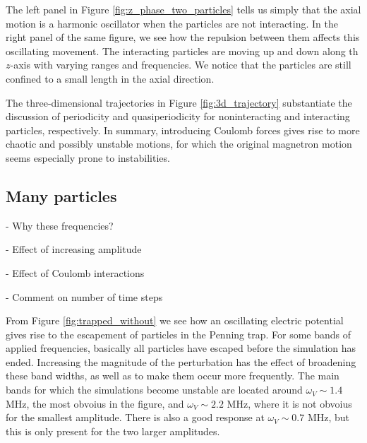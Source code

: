 The left panel in Figure \ref{fig:z_phase_two_particles} tells us simply that the axial motion is a harmonic oscillator  when the particles are not interacting. In the right panel of the same figure, we see how the repulsion between them affects this oscillating movement. The interacting particles are moving up and down along th $z$-axis with varying ranges and frequencies. We notice that the particles are still confined to a small length in the axial direction. 

The three-dimensional trajectories in Figure \ref{fig:3d_trajectory} substantiate the discussion of periodicity and quasiperiodicity for noninteracting and interacting particles, respectively. In summary, introducing Coulomb forces gives rise to more chaotic and possibly unstable motions, for which the original magnetron motion seems especially prone to instabilities.





\subsection{Many particles}

\par - Why these frequencies? 
\par - Effect of increasing amplitude 
\par - Effect of Coulomb interactions 
\par - Comment on number of time steps 

From Figure \ref{fig:trapped_without} we see how an oscillating electric potential gives rise to the escapement of particles in the Penning trap. For some bands of applied frequencies, basically all particles have escaped before the simulation has ended. Increasing the magnitude of the perturbation has the effect of broadening these band widths, as well as to make them occur more frequently. The main bands for which the simulations become unstable are located around $\omega_V \sim 1.4$ MHz, the most obvoius in the figure, and $\omega_V \sim 2.2$ MHz, where it is not obvoius for the smallest amplitude. There is also a good response at $\omega_V\sim 0.7$ MHz, but this is only present for the two larger amplitudes.

